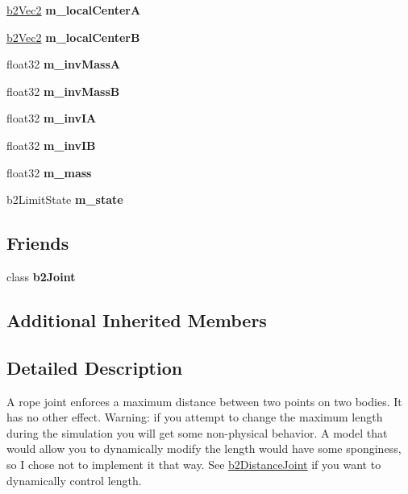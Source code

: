 \begin{DoxyCompactItemize}
\hyperlink{structb2Vec2}{b2\+Vec2} {\bfseries m\+\_\+local\+CenterA}
\item 
\mbox{\label{classb2RopeJoint_a2b3b1ac9ae9e3e68b2550809ec178877}} 
\hyperlink{structb2Vec2}{b2\+Vec2} {\bfseries m\+\_\+local\+CenterB}
\item 
\mbox{\label{classb2RopeJoint_a690e4fe5ab7a279accac3b137d5f5c76}} 
float32 {\bfseries m\+\_\+inv\+MassA}
\item 
\mbox{\label{classb2RopeJoint_a9709179725abed80d4957df82bc24512}} 
float32 {\bfseries m\+\_\+inv\+MassB}
\item 
\mbox{\label{classb2RopeJoint_a1917a65b89668c433d06071970a6875a}} 
float32 {\bfseries m\+\_\+inv\+IA}
\item 
\mbox{\label{classb2RopeJoint_a1ce440194cec6e275193d7224ce1e448}} 
float32 {\bfseries m\+\_\+inv\+IB}
\item 
\mbox{\label{classb2RopeJoint_a1f355a976b177b75a8fd47190194d5c1}} 
float32 {\bfseries m\+\_\+mass}
\item 
\mbox{\label{classb2RopeJoint_ac73c9451360c80c8a98376b922f4bed4}} 
b2\+Limit\+State {\bfseries m\+\_\+state}
\end{DoxyCompactItemize}
\subsection*{Friends}
\begin{DoxyCompactItemize}
\item 
\mbox{\label{classb2RopeJoint_a2f8aeb7f12b8fbe115431953a4926eed}} 
class {\bfseries b2\+Joint}
\end{DoxyCompactItemize}
\subsection*{Additional Inherited Members}


\subsection{Detailed Description}
A rope joint enforces a maximum distance between two points on two bodies. It has no other effect. Warning\+: if you attempt to change the maximum length during the simulation you will get some non-\/physical behavior. A model that would allow you to dynamically modify the length would have some sponginess, so I chose not to implement it that way. See \hyperlink{classb2DistanceJoint}{b2\+Distance\+Joint} if you want to dynamically control length. 

